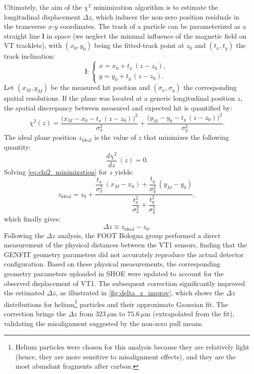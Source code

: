 Ultimately, the aim of the $\chi^2$ minimization algorithm is to estimate the longitudinal displacement $\Delta z$, which induces the non-zero position residuals in the transverse $x$-$y$ coordinates. The track of a particle can be parameterized as a straight line $\mathbf{l}$ in space (we neglect the minimal influence of the magnetic field on VT tracklets), with $(x_0, y_0)$ being the fitted-track point at $z_0$ and $(t_x, t_y)$ the track inclination:
\begin{equation}
	\mathbf{l}:
	\begin{cases}
		x = x_0 + t_x\,(z - z_0), \\
		y = y_0 + t_y\,(z - z_0).
	\end{cases}
	\label{eq:track_parametrization}
\end{equation}
Let $(x_M, y_M)$ be the measured hit position and $(\sigma_x,\sigma_y)$ the corresponding spatial resolutions. If the plane was located at a generic longitudinal position $z$, the spatial discrepancy between measured and expected hit is quantified by:
\begin{equation}
	\chi^2(z) =
	\frac{\bigl(x_M - x_0 - t_x\,(z - z_0)\bigr)^2}{\sigma_x^2}
	+
	\frac{\bigl(y_M - y_0 - t_y\,(z - z_0)\bigr)^2}{\sigma_y^2}.
	\label{eq:chi2_z}
\end{equation}
The ideal plane position $z_\text{ideal}$ is the value of $z$ that minimizes the following quantity:
\begin{equation}
	\frac{d\chi^2}{dz}\,(z) = 0.
	\label{eq:chi2_minimization}
\end{equation}
Solving \autoref{eq:chi2_minimization} for $z$ yields:
\begin{equation}
	z_\text{ideal} = z_0 +
	\frac{\dfrac{t_x}{\sigma_x^2}\,(x_M - x_0) + \dfrac{t_y}{\sigma_y^2}\,(y_M - y_0)}
	{\dfrac{t_x^2}{\sigma_x^2} + \dfrac{t_y^2}{\sigma_y^2}},
	\label{eq:z_ideal}
\end{equation}
which finally gives:
\begin{equation}
	\Delta z\equiv z_\text{ideal} - z_0.
	\label{eq:delta_z}
\end{equation}
Following the $\Delta z$ analysis, the FOOT Bologna group performed a direct measurement of the physical distances between the VT1 sensors, finding that the GENFIT geometry parameters did not accurately reproduce the actual detector configuration. Based on these physical measurements, the corresponding geometry parameters uploaded in SHOE were updated to account for the observed displacement of VT1. The subsequent correction significantly improved the estimated $\Delta z$, as illustrated in \autoref{fig:delta_z_improv}, which shows the $\Delta z$ distributions for helium\footnote{Helium particles were chosen for this analysis because they are relatively light (hence, they are more sensitive to misalignment effects), and they are the most abundant fragments after carbon.} particles and their approximate Gaussian fit. The correction brings the $\Delta z$ from $323\,\mu\mathrm{m}$ to $75.6\,\mu\mathrm{m}$ (extrapolated from the fit), validating the misalignment suggested by the non-zero pull means.
